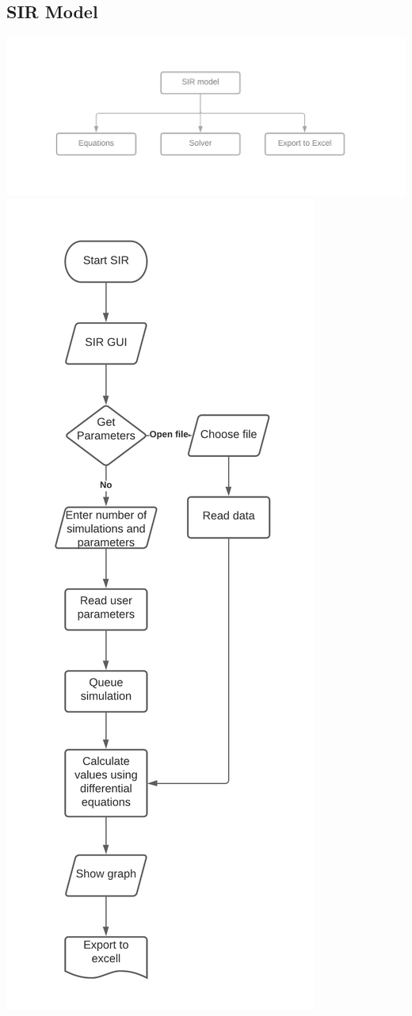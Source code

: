 \documentclass[11pt, a4paper]{article}
\begin{document}
\subsection{SIR Model}
\includegraphics[width=\textwidth]{s_SIR.png}
\newpage
\includegraphics[width=\textwidth, height=\textheight]{f_SIR.png}
\end{document}
